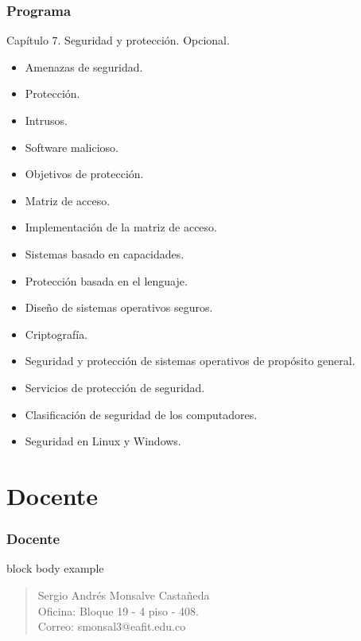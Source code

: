 \documentclass[xcolor=svgnames]{beamer}
\theoremstyle{example}
\begin{document}
\begin{frame}[shrink]
  \frametitle{Programa}
  \begin{block}{Capítulo 7. Seguridad y protección. Opcional.}
    \begin{itemize}%
    \item Amenazas de seguridad.
    \item Protección.
    \item Intrusos.
    \item Software malicioso.
    \item Objetivos de protección.
    \item Matriz de acceso.
    \item Implementación de la matriz de acceso.
    \item Sistemas basado en capacidades.
    \item Protección basada en el lenguaje.
    \item Diseño de sistemas operativos seguros.
    \item Criptografía.
    \item Seguridad y protección de sistemas operativos de propósito general.
    \item Servicios de protección de seguridad.
    \item Clasificación de seguridad de los computadores.
    \item Seguridad en Linux y Windows.
    \end{itemize}    
  \end{block}
\end{frame}

\section{Docente}

\begin{frame}
  \frametitle{Docente}
  \begin{beamercolorbox}[wd=\textwidth,rounded=false,shadow=true]
    {block body example}
    \begin{quote}
      Sergio Andrés Monsalve Castañeda
      \\
      Oficina: Bloque 19 - 4 piso - 408.
      \\
      Correo: smonsal3@eafit.edu.co
    \end{quote}
  \end{beamercolorbox}
\end{frame}
\end{document}
